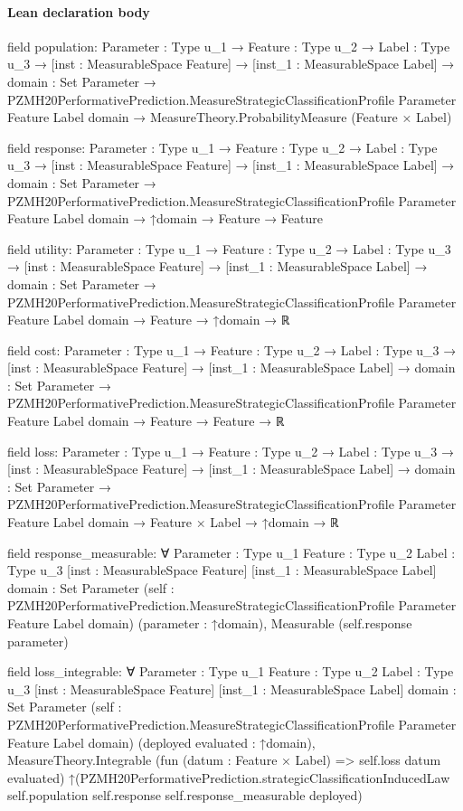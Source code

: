 \documentclass[10pt]{article}
\begin{document}
\paragraph{Lean declaration body}
\begin{ReviewVerbatim}
field population:
{Parameter : Type u_1} →
  {Feature : Type u_2} →
    {Label : Type u_3} →
      [inst : MeasurableSpace Feature] →
        [inst_1 : MeasurableSpace Label] →
          {domain : Set Parameter} →
            PZMH20PerformativePrediction.MeasureStrategicClassificationProfile Parameter Feature Label domain →
              MeasureTheory.ProbabilityMeasure (Feature × Label)

field response:
{Parameter : Type u_1} →
  {Feature : Type u_2} →
    {Label : Type u_3} →
      [inst : MeasurableSpace Feature] →
        [inst_1 : MeasurableSpace Label] →
          {domain : Set Parameter} →
            PZMH20PerformativePrediction.MeasureStrategicClassificationProfile Parameter Feature Label domain →
              ↑domain → Feature → Feature

field utility:
{Parameter : Type u_1} →
  {Feature : Type u_2} →
    {Label : Type u_3} →
      [inst : MeasurableSpace Feature] →
        [inst_1 : MeasurableSpace Label] →
          {domain : Set Parameter} →
            PZMH20PerformativePrediction.MeasureStrategicClassificationProfile Parameter Feature Label domain →
              Feature → ↑domain → ℝ

field cost:
{Parameter : Type u_1} →
  {Feature : Type u_2} →
    {Label : Type u_3} →
      [inst : MeasurableSpace Feature] →
        [inst_1 : MeasurableSpace Label] →
          {domain : Set Parameter} →
            PZMH20PerformativePrediction.MeasureStrategicClassificationProfile Parameter Feature Label domain →
              Feature → Feature → ℝ

field loss:
{Parameter : Type u_1} →
  {Feature : Type u_2} →
    {Label : Type u_3} →
      [inst : MeasurableSpace Feature] →
        [inst_1 : MeasurableSpace Label] →
          {domain : Set Parameter} →
            PZMH20PerformativePrediction.MeasureStrategicClassificationProfile Parameter Feature Label domain →
              Feature × Label → ↑domain → ℝ

field response_measurable:
∀ {Parameter : Type u_1} {Feature : Type u_2} {Label : Type u_3} [inst : MeasurableSpace Feature]
  [inst_1 : MeasurableSpace Label] {domain : Set Parameter}
  (self : PZMH20PerformativePrediction.MeasureStrategicClassificationProfile Parameter Feature Label domain)
  (parameter : ↑domain), Measurable (self.response parameter)

field loss_integrable:
∀ {Parameter : Type u_1} {Feature : Type u_2} {Label : Type u_3} [inst : MeasurableSpace Feature]
  [inst_1 : MeasurableSpace Label] {domain : Set Parameter}
  (self : PZMH20PerformativePrediction.MeasureStrategicClassificationProfile Parameter Feature Label domain)
  (deployed evaluated : ↑domain),
  MeasureTheory.Integrable (fun (datum : Feature × Label) => self.loss datum evaluated)
    ↑(PZMH20PerformativePrediction.strategicClassificationInducedLaw self.population self.response
        self.response_measurable deployed)
\end{ReviewVerbatim}
\end{document}
